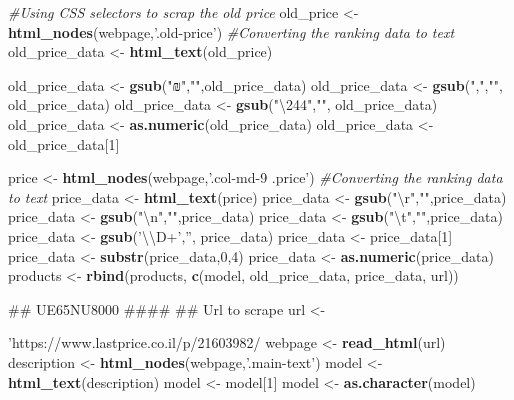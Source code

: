 \documentclass[]{article}
\newenvironment{Shaded}{\begin{snugshade}}{\end{snugshade}}
\newcommand{\KeywordTok}[1]{\textcolor[rgb]{0.13,0.29,0.53}{\textbf{#1}}}
\newcommand{\DecValTok}[1]{\textcolor[rgb]{0.00,0.00,0.81}{#1}}
\newcommand{\CharTok}[1]{\textcolor[rgb]{0.31,0.60,0.02}{#1}}
\newcommand{\StringTok}[1]{\textcolor[rgb]{0.31,0.60,0.02}{#1}}
\newcommand{\CommentTok}[1]{\textcolor[rgb]{0.56,0.35,0.01}{\textit{#1}}}
\newcommand{\NormalTok}[1]{#1}
\begin{document}
\begin{Shaded}
\begin{Highlighting}[]
{{\CommentTok{#Using CSS selectors to scrap the old price}
\NormalTok{old_price <-}\StringTok{ }\KeywordTok{html_nodes}\NormalTok{(webpage,}\StringTok{'.old-price'}\NormalTok{)}
\CommentTok{#Converting the ranking data to text }
\NormalTok{old_price_data <-}\StringTok{ }\KeywordTok{html_text}\NormalTok{(old_price)}

\NormalTok{old_price_data <-}\StringTok{ }\KeywordTok{gsub}\NormalTok{(}\StringTok{"₪"}\NormalTok{,}\StringTok{""}\NormalTok{,old_price_data)}
\NormalTok{old_price_data <-}\StringTok{ }\KeywordTok{gsub}\NormalTok{(}\StringTok{","}\NormalTok{,}\StringTok{""}\NormalTok{, old_price_data)}
\NormalTok{old_price_data <-}\StringTok{ }\KeywordTok{gsub}\NormalTok{(}\StringTok{"\textbackslash{}244"}\NormalTok{,}\StringTok{""}\NormalTok{, old_price_data)}
\NormalTok{old_price_data <-}\StringTok{ }\KeywordTok{as.numeric}\NormalTok{(old_price_data)}
\NormalTok{old_price_data <-}\StringTok{ }\NormalTok{old_price_data[}\DecValTok{1}\NormalTok{]}

\NormalTok{price <-}\StringTok{ }\KeywordTok{html_nodes}\NormalTok{(webpage,}\StringTok{'.col-md-9 .price'}\NormalTok{)}
\CommentTok{#Converting the ranking data to text }
\NormalTok{price_data <-}\StringTok{ }\KeywordTok{html_text}\NormalTok{(price)}
\NormalTok{price_data <-}\StringTok{ }\KeywordTok{gsub}\NormalTok{(}\StringTok{"}\CharTok{\textbackslash{}r}\StringTok{"}\NormalTok{,}\StringTok{""}\NormalTok{,price_data) }
\NormalTok{price_data <-}\StringTok{ }\KeywordTok{gsub}\NormalTok{(}\StringTok{"}\CharTok{\textbackslash{}n}\StringTok{"}\NormalTok{,}\StringTok{""}\NormalTok{,price_data) }
\NormalTok{price_data <-}\StringTok{ }\KeywordTok{gsub}\NormalTok{(}\StringTok{"}\CharTok{\textbackslash{}t}\StringTok{"}\NormalTok{,}\StringTok{""}\NormalTok{,price_data) }
\NormalTok{price_data <-}\StringTok{ }\KeywordTok{gsub}\NormalTok{(}\StringTok{'}\CharTok{\textbackslash{}\textbackslash{}}\StringTok{D+'}\NormalTok{,}\StringTok{''}\NormalTok{, price_data)}
\NormalTok{price_data <-}\StringTok{ }\NormalTok{price_data[}\DecValTok{1}\NormalTok{]}
\NormalTok{price_data <-}\StringTok{ }\KeywordTok{substr}\NormalTok{(price_data,}\DecValTok{0}\NormalTok{,}\DecValTok{4}\NormalTok{)}
\NormalTok{price_data <-}\StringTok{ }\KeywordTok{as.numeric}\NormalTok{(price_data)}
\NormalTok{products <-}\StringTok{ }\KeywordTok{rbind}\NormalTok{(products, }\KeywordTok{c}\NormalTok{(model, old_price_data, price_data, url))}

\NormalTok{## UE65NU8000 ####}
\NormalTok{## Url to scrape}
\NormalTok{url <-}\StringTok{'https://www.lastprice.co.il/p/21603982/%D7%98%D7%9C%D7%95%D7%99%D7%96%D7%99%D7%94-65%27%27-Samsung/Samsung-UE65NU8000'}
\NormalTok{webpage <-}\StringTok{ }\KeywordTok{read_html}\NormalTok{(url) }
\NormalTok{description <-}\StringTok{ }\KeywordTok{html_nodes}\NormalTok{(webpage,}\StringTok{'.main-text'}\NormalTok{)}
\NormalTok{model <-}\StringTok{ }\KeywordTok{html_text}\NormalTok{(description)}
\NormalTok{model <-}\StringTok{ }\NormalTok{model[}\DecValTok{1}\NormalTok{]}
\NormalTok{model <-}\StringTok{ }\KeywordTok{as.character}\NormalTok{(model)}

}}}
\end{Highlighting}
\end{Shaded}
\end{document}

